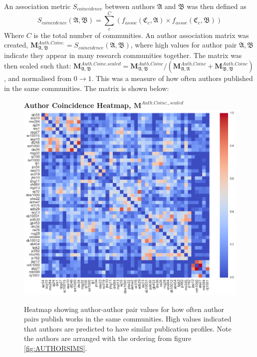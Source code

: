 An association metric $S_{coincidence}$ between authors $\mathfrak{A}$ and $\mathfrak{B}$ was then defined as $$S_{coincidence}\left( \mathfrak{A} , \mathfrak{B} \right) = \sum_c^C \left(f_{assoc} \left( \mathfrak{C}_c , \mathfrak{A} \right)\times f_{assoc}\left( \mathfrak{C}_c , \mathfrak{B} \right) \right) $$
Where $C$ is the total number of communities. An author association matrix was created, $\mathbf{M}^{Auth. Coinc.}_{\mathfrak{A} , \mathfrak{B}} = S_{coincidence}\left( \mathfrak{A} , \mathfrak{B} \right)$, where high values for author pair $\mathfrak{A} , \mathfrak{B}$ indicate they appear in many research communities together. The matrix was then scaled such that: $\mathbf{M}^{Auth. Coinc.scaled}_{\mathfrak{A} , \mathfrak{B}} =  \mathbf{M}^{Auth. Coinc}_{\mathfrak{A} , \mathfrak{B}} /  \left( \mathbf{M}^{Auth. Coinc}_{\mathfrak{A} , \mathfrak{A}} + \mathbf{M}^{Auth. Coinc}_{\mathfrak{B} , \mathfrak{B}} \right) $, and normalised from $0 \rightarrow 1$. This was a measure of how often authors published in the same communities. The matrix is shown below:
\begin{center}
\begin{figure}[H]
  \centering
  \textbf{Author Coincidence Heatmap, $\mathbf{M}^{Auth. Coinc.,scaled}$}
    \includegraphics[width=\textwidth]{Analysis/author_comm_heatmap.png}
    \caption[Author Coincidence Matrix Heatmap]{Heatmap showing author-author pair values for how often author pairs publish works in the same communities. High values indicated that authors are predicted to have similar publication profiles. Note the authors are arranged with the ordering from figure \ref{fig:AUTHORSIMS}.}
    \label{fig:commHEATMAP}
\end{figure} 
\end{center}
